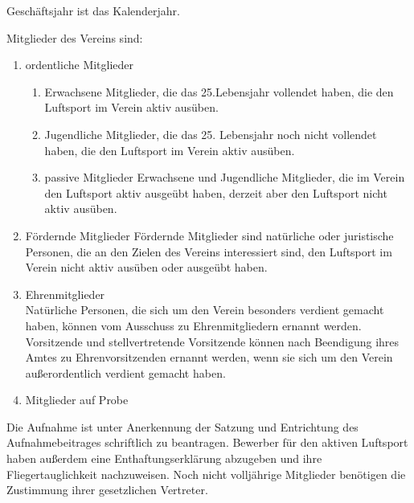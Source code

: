\documentclass[10pt,a4paper,parskip=half]{scrartcl}
\begin{document}
\begin{contract}
    Geschäftsjahr ist das Kalenderjahr.
    
    \label{C:Mitglieder}
    
    Mitglieder des Vereins sind:
    \begin{enumerate}
      \item ordentliche Mitglieder
            \begin{enumerate}
              \item Erwachsene Mitglieder,
                    die das 25.Lebensjahr vollendet haben,
                    die den Luftsport im Verein aktiv
                    ausüben. \label{S:OrdentlicheMitglieder:Erwachsene}
              \item Jugendliche Mitglieder,
                    die das 25. Lebensjahr noch nicht vollendet haben,
                    die den Luftsport im Verein aktiv ausüben. \label{S:OrdentlicheMitglieder:Jugendliche}
              \item{passive Mitglieder} Erwachsene und Jugendliche Mitglieder,
                    die im Verein den Luftsport aktiv ausgeübt haben,
                    derzeit aber den Luftsport nicht aktiv ausüben.
            \end{enumerate}
      \item{Fördernde Mitglieder} Fördernde Mitglieder sind natürliche oder juristische Personen,
            die an den Zielen des Vereins interessiert sind,
            den Luftsport im Verein nicht aktiv ausüben oder ausgeübt haben.
            
      \item{Ehrenmitglieder}\\
            Natürliche Personen,
            die sich um den Verein besonders verdient gemacht haben,
            können vom Ausschuss zu Ehrenmitgliedern ernannt werden.
            Vorsitzende und stellvertretende Vorsitzende können nach Beendigung ihres Amtes zu Ehrenvorsitzenden ernannt werden,
            wenn sie sich um den Verein außerordentlich verdient gemacht haben.
      \item Mitglieder auf Probe\label{S:MitgliederAufProbe}
    \end{enumerate}\label{S:OrdentlicheMitglieder}
    
    
    Die Aufnahme ist unter Anerkennung der Satzung und Entrichtung des Aufnahmebeitrages schriftlich zu beantragen.
    Bewerber für den aktiven Luftsport haben außerdem eine Enthaftungserklärung abzugeben und ihre Fliegertauglichkeit nachzuweisen.
    Noch nicht volljährige Mitglieder benötigen die Zustimmung ihrer gesetzlichen Vertreter.
    

\end{contract}
\end{document}
